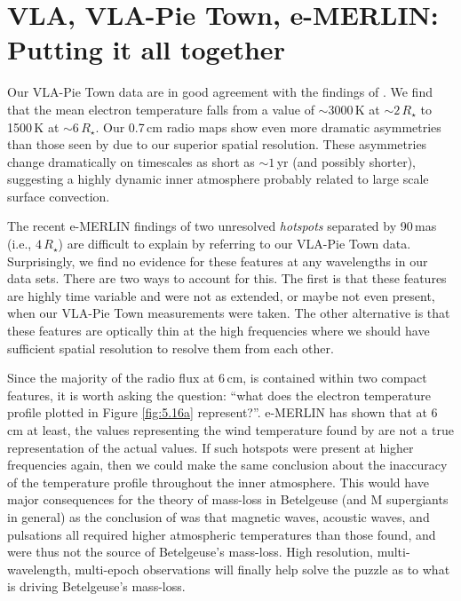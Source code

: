 \section{VLA, VLA-Pie Town, e-MERLIN: Putting it all together}\label{sec:5.15}
Our VLA-Pie Town data are in good agreement with the findings of \cite{lim_1998}. We find that the mean electron temperature falls from a value of $\sim 3000$\,K at $\sim 2\,R_{\star}$ to 1500\,K at $\sim 6\,R_{\star}$. Our 0.7\,cm radio maps show even more dramatic asymmetries than those seen by \cite{lim_1998} due to our  superior spatial resolution. These asymmetries change dramatically on timescales as short as $\sim 1$\,yr (and possibly shorter), suggesting a highly dynamic inner atmosphere probably related to large scale surface convection.

The recent e-MERLIN findings of two unresolved \textit{hotspots} separated by 90\,mas (i.e., $4\,R_{\star}$) are difficult to explain by referring to our VLA-Pie Town data. Surprisingly, we find no evidence for these features at any wavelengths in our data sets. There are two ways to account for this. The first is that these features are highly time variable and were not as extended, or maybe not even present, when our VLA-Pie Town measurements were taken. The other alternative is that these features are optically thin at the high frequencies where we should have sufficient spatial resolution to resolve them from each other. 

Since the majority of the radio flux at 6\,cm, is contained within two compact features, it is worth asking the question: ``what does the electron temperature profile plotted in Figure \ref{fig:5.16a} represent?''. e-MERLIN  has shown that at 6\,cm at least, the values representing the wind temperature found by \cite{lim_1998} are not a true representation of the actual values. If such hotspots were present at higher frequencies again, then we could make the same conclusion about the inaccuracy of the temperature profile throughout the inner atmosphere. This would have major consequences for the theory of mass-loss in Betelgeuse (and M supergiants in general) as the conclusion of \cite{lim_1998} was that magnetic waves, acoustic waves, and pulsations all required higher atmospheric temperatures than those found, and were thus not the source of Betelgeuse's mass-loss. High resolution, multi-wavelength, multi-epoch observations will finally help solve the puzzle as to what is driving Betelgeuse's mass-loss.


